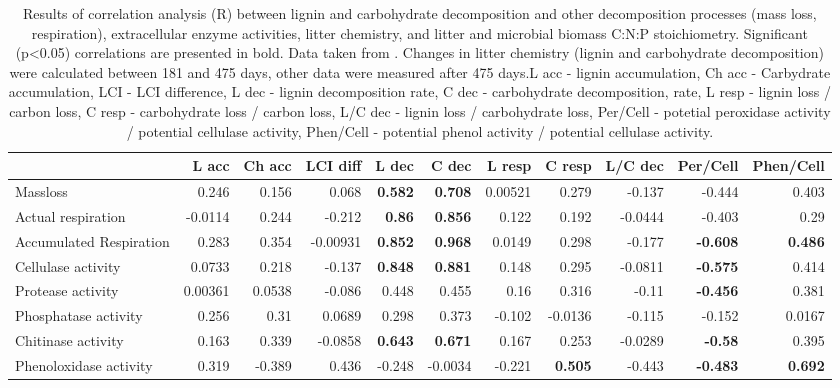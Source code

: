 \documentclass[10pt]{article}
\begin{document}
\begin{flushleft}
\begin{landscape}
\begin{table}[h!]
\begin{center}
\caption{Results of correlation analysis (R) between lignin and carbohydrate decomposition and other decomposition processes (mass loss, respiration), extracellular enzyme activities, litter chemistry, and litter and microbial biomass C:N:P stoichiometry. Significant (p\textless 0.05) correlations are presented in bold. Data taken from \cite{Mooshammer2011, Leitner2011}. Changes in litter chemistry (lignin and carbohydrate decomposition) were calculated between 181 and 475 days, other data were measured after 475 days.L acc - lignin accumulation, Ch acc - Carbydrate accumulation, LCI - LCI difference, L dec - lignin decomposition rate, C dec - carbohydrate decomposition,  rate, L resp - lignin loss / carbon loss, C resp - carbohydrate loss / carbon loss, L/C dec - lignin loss / carbohydrate loss, Per/Cell - potetial peroxidase activity / potential cellulase activity, Phen/Cell - potential phenol activity / potential cellulase activity.}
\label{corrtable2}
{\small
\begin{tabular}{lrrrrrrrrrr}
  \hline
 & L acc & Ch acc & LCI diff & L dec & C dec & L resp & C resp & L/C dec & Per/Cell & Phen/Cell \\ 
  \hline
Massloss & 0.246 & 0.156 & 0.068 & \textbf{ 0.582 } & \textbf{ 0.708 } & 0.00521 & 0.279 & -0.137 & -0.444 & 0.403 \\ 
  Actual respiration & -0.0114 & 0.244 & -0.212 & \textbf{ 0.86 } & \textbf{ 0.856 } & 0.122 & 0.192 & -0.0444 & -0.403 & 0.29 \\ 
  Accumulated Respiration & 0.283 & 0.354 & -0.00931 & \textbf{ 0.852 } & \textbf{ 0.968 } & 0.0149 & 0.298 & -0.177 & \textbf{ -0.608 } & \textbf{ 0.486 } \\ 
  Cellulase activity & 0.0733 & 0.218 & -0.137 & \textbf{ 0.848 } & \textbf{ 0.881 } & 0.148 & 0.295 & -0.0811 & \textbf{ -0.575 } & 0.414 \\ 
  Protease activity & 0.00361 & 0.0538 & -0.086 & 0.448 & 0.455 & 0.16 & 0.316 & -0.11 & \textbf{ -0.456 } & 0.381 \\ 
  Phosphatase activity & 0.256 & 0.31 & 0.0689 & 0.298 & 0.373 & -0.102 & -0.0136 & -0.115 & -0.152 & 0.0167 \\ 
  Chitinase activity & 0.163 & 0.339 & -0.0858 & \textbf{ 0.643 } & \textbf{ 0.671 } & 0.167 & 0.253 & -0.0289 & \textbf{ -0.58 } & 0.395 \\ 
  Phenoloxidase activity & 0.319 & -0.389 & 0.436 & -0.248 & -0.0034 & -0.221 & \textbf{ 0.505 } & -0.443 & \textbf{ -0.483 } & \textbf{ 0.692 } \\ 

\end{tabular}}
\end{center}
\end{table}
\end{landscape}
\end{flushleft}
\end{document}
